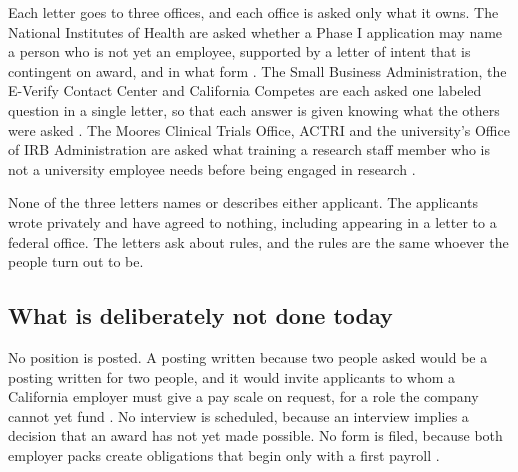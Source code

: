 Each letter goes to three offices, and each office is asked only what it owns.
The National Institutes of Health are asked whether a Phase I application may
name a person who is not yet an employee, supported by a letter of intent that
is contingent on award, and in what form \cite{nihsbirseed,nihgpssmallbiz}. The
Small Business Administration, the E-Verify Contact Center and California
Competes are each asked one labeled question in a single letter, so that each
answer is given knowing what the others were asked
\cite{sbacontact2026,everify2026,calcompetes2026}. The Moores Clinical Trials
Office, ACTRI and the university's Office of IRB Administration are asked what
training a research staff member who is not a university employee needs before
being engaged in research \cite{ucsdmoorescto2026,ucsdactri2026,ucsdirb2026}.

None of the three letters names or describes either applicant. The applicants
wrote privately and have agreed to nothing, including appearing in a letter to a
federal office. The letters ask about rules, and the rules are the same whoever
the people turn out to be.

\subsection{What is deliberately not done today}

No position is posted. A posting written because two people asked would be a
posting written for two people, and it would invite applicants to whom a
California employer must give a pay scale on request, for a role the company
cannot yet fund \cite{calab4323}. No interview is scheduled, because an
interview implies a decision that an award has not yet made possible. No form is
filed, because both employer packs create obligations that begin only with a
first payroll \cite{eddregister2026,eddnewhire2026}.

